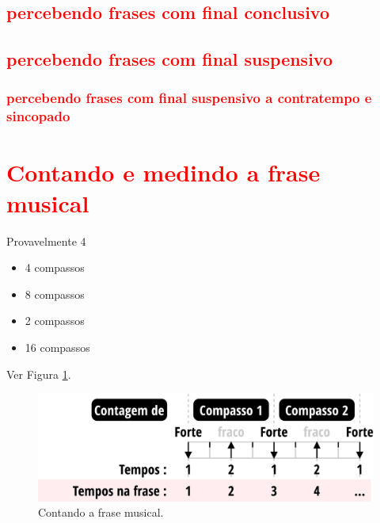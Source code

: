 \subsection{\textcolor{red}{percebendo frases com final conclusivo}}

\subsection{\textcolor{red}{percebendo frases com final suspensivo}}


\subsubsection{\textcolor{red}{percebendo frases com final suspensivo a contratempo e sincopado}}

\section{\textcolor{red}{Contando e medindo a frase musical}}
Provavelmente 4
\begin{itemize}
\item 4 compassos
\item 8 compassos
\item 2 compassos
\item 16 compassos
\end{itemize}


Ver Figura \ref{fig:contagemtemposfrase}.
\begin{figure}
    \centering
    \includegraphics[width=\textwidth]{chapters/cap-musicalidade/contagemtemposfrase.eps}
    \caption{Contando a frase musical.}
    \label{fig:contagemtemposfrase}
\end{figure}

